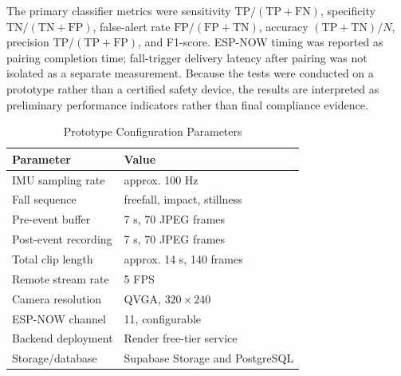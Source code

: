 \documentclass[conference]{IEEEtran}
\begin{document}
The primary classifier metrics were sensitivity $\mathrm{TP}/(\mathrm{TP}+\mathrm{FN})$, specificity $\mathrm{TN}/(\mathrm{TN}+\mathrm{FP})$, false-alert rate $\mathrm{FP}/(\mathrm{FP}+\mathrm{TN})$, accuracy $(\mathrm{TP}+\mathrm{TN})/N$, precision $\mathrm{TP}/(\mathrm{TP}+\mathrm{FP})$, and F1-score. ESP-NOW timing was reported as pairing completion time; fall-trigger delivery latency after pairing was not isolated as a separate measurement. Because the tests were conducted on a prototype rather than a certified safety device, the results are interpreted as preliminary performance indicators rather than final compliance evidence.

\begin{table}[!t]
\caption{Prototype Configuration Parameters}
\label{tab:config}
\centering
\begin{tabular}{|p{}|p{}|}
\hline
\textbf{Parameter} & \textbf{Value} \\
\hline
IMU sampling rate & approx. 100 Hz \\
\hline
Fall sequence & freefall, impact, stillness \\
\hline
Pre-event buffer & 7 s, 70 JPEG frames \\
\hline
Post-event recording & 7 s, 70 JPEG frames \\
\hline
Total clip length & approx. 14 s, 140 frames \\
\hline
Remote stream rate & 5 FPS \\
\hline
Camera resolution & QVGA, $320\times240$ \\
\hline
ESP-NOW channel & 11, configurable \\
\hline
Backend deployment & Render free-tier service \\
\hline
Storage/database & Supabase Storage and PostgreSQL \\
\hline
\end{tabular}
\end{table}
\end{document}
